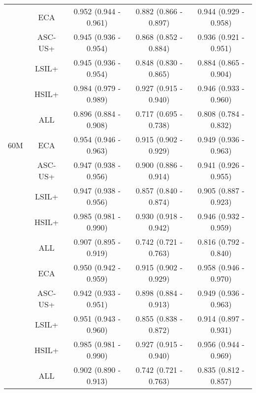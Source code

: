 \begin{table}[h]
\begin{tabular}{cc|ccc}
  \rowcolor{cusyellowl} \multirow{1}{*}{30M}&ECA & 0.952 (0.944 - 0.961) & 0.882 (0.866 - 0.897) & 0.944 (0.929 - 0.958) \\
  \rowcolor{cusyellowl} &ASC-US+ & 0.945 (0.936 - 0.954) & 0.868 (0.852 - 0.884) & 0.936 (0.921 - 0.951) \\
  \rowcolor{cusyellowl} &LSIL+  & 0.945 (0.936 - 0.954) & 0.848 (0.830 - 0.865)  & 0.884 (0.865 - 0.904) \\
  \rowcolor{cusyellowl} &HSIL+    & 0.984 (0.979 - 0.989) & 0.927 (0.915 - 0.940) & 0.946 (0.933 - 0.960)\\
  \rowcolor{cusyellowl} &ALL    & 0.896 (0.884 - 0.908) & 0.717 (0.695 - 0.738) & 0.808 (0.784 - 0.832) \\ 

\multirow{1}{*}{60M}&ECA   & 0.954 (0.946 - 0.963) & 0.915 (0.902 - 0.929)& 0.949 (0.936 - 0.963)\\
&ASC-US+  & 0.947 (0.938 - 0.956) & 0.900 (0.886 - 0.914)& 0.941 (0.926 - 0.955)\\
&LSIL+   & 0.947 (0.938 - 0.956) & 0.857 (0.840 - 0.874)  &  0.905 (0.887 - 0.923)\\
&HSIL+  & 0.985 (0.981 - 0.990) & 0.930 (0.918 - 0.942)  & 0.946 (0.932 - 0.959) \\
&ALL & 0.907 (0.895 - 0.919) & 0.742 (0.721 - 0.763) & 0.816 (0.792 - 0.840) \\

  \rowcolor{cusyellowl} \multirow{1}{*}{100M}&ECA  & 0.950 (0.942 - 0.959) & 0.915 (0.902 - 0.929) & 0.958 (0.946 - 0.970) \\
  \rowcolor{cusyellowl} &ASC-US+  & 0.942 (0.933 - 0.951) & 0.898 (0.884 - 0.913) & 0.949 (0.936 - 0.963) \\
  \rowcolor{cusyellowl} &LSIL+ & 0.951 (0.943 - 0.960) & 0.855 (0.838 - 0.872) & 0.914 (0.897 - 0.931)\\
  \rowcolor{cusyellowl} &HSIL+   & 0.985 (0.981 - 0.990) & 0.927 (0.915 - 0.940) & 0.956 (0.944 - 0.969)\\
  \rowcolor{cusyellowl} &ALL & 0.902 (0.890 - 0.913) & 0.742 (0.721 - 0.763) & 0.835 (0.812 - 0.857) \\ 

\hline 
\end{tabular} 
\label{ST_pretrain_wsi}
\end{table}


